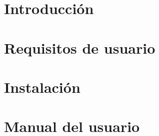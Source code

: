 
\section{Introducción}

\section{Requisitos de usuario}

\section{Instalación}

\section{Manual del usuario}


